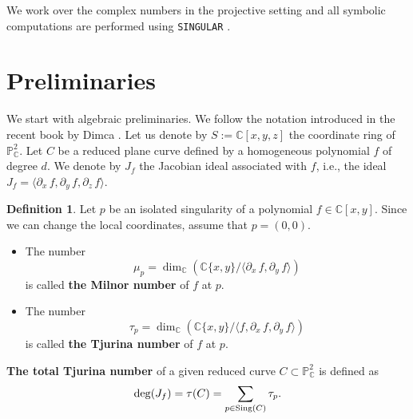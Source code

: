 \documentclass[11pt]{article}
\theoremstyle{plain}
\theoremstyle{definition}
\newtheorem{definition}[thm]{Definition}
\begin{document}
We work over the complex numbers in the projective setting and all symbolic computations are performed using \verb}SINGULAR} \cite{Singular}.

\section{Preliminaries}

We start with algebraic preliminaries. We follow the notation introduced in the recent book by Dimca \cite{Dimca}. Let us denote by $S := \mathbb{C}[x,y,z]$ the coordinate ring of $\mathbb{P}^{2}_{\mathbb{C}}$. Let $C$ be a reduced plane curve defined by a homogeneous polynomial $f$ of degree $d$. We denote by $J_{f}$ the Jacobian ideal associated with $f$, i.e., the ideal $J_{f} = \langle \partial_{x}\, f, \partial_{y} \, f, \partial_{z} \, f \rangle$.
\begin{definition}
Let $p$ be an isolated singularity of a polynomial $f\in \mathbb{C}[x,y]$. Since we can change the local coordinates, assume that $p=(0,0)$.
\begin{itemize}
    
\item The number 
$$\mu_{p}=\dim_\mathbb{C}\left(\mathbb{C}\{x,y\} /\bigg\langle \partial_{x}\, f ,\partial_{y}\, f \bigg\rangle\right)$$
is called \textbf{the Milnor number} of $f$ at $p$.

\item The number
$$\tau_{p}=\dim_\mathbb{C}\left(\mathbb{C}\{x,y\}/\bigg\langle f, \partial_{x}\, f ,\partial_{y} \, f \bigg\rangle \right)$$
is called \textbf{the Tjurina number} of $f$ at $p$.

\end{itemize}
\end{definition}

\textbf{The total Tjurina number} of a given reduced curve $C \subset \mathbb{P}^{2}_{\mathbb{C}}$ is defined as
$${\rm deg}(J_{f}) = \tau(C) = \sum_{p \in {\rm Sing}(C)} \tau_{p}.$$ 
\end{document}
